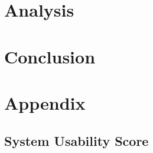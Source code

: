 \documentclass[12pt,numbers=noenddot,parskip,bibliography=totocnumbered,listof=totocnumbered,draft]{scrreprt}
\begin{document}
\chapter{Analysis}



\chapter{Conclusion}



\appendix
\chapter{Appendix}

\newpage
\section{System Usability Score}
\vfill
{}
\label{sus}
\vfill
\end{document}
